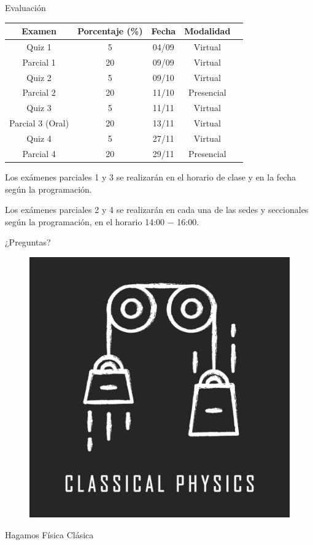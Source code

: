 \begin{frame}{Evaluación}
\begin{table}[]
    \centering
    \begin{tabular}{|c|c|c|c|c|}
    \hline
     \textbf{Examen} &  \textbf{Porcentaje (\%)}  &  \textbf{Fecha}& \textbf{Modalidad}\\\hline
     Quiz 1 & 5  &  04/09& Virtual\\\hline
     Parcial 1 & 20  &  09/09& Virtual\\\hline
     Quiz 2 & 5  & 09/10& Virtual \\\hline
     Parcial 2 & 20  & 11/10& Presencial\\\hline
     Quiz 3 & 5  & 11/11& Virtual\\\hline
     Parcial 3 (Oral) & 20 & 13/11& Virtual\\\hline
     Quiz 4 & 5  & 27/11& Virtual\\\hline
     Parcial 4 & 20  & 29/11& Presencial\\\hline
\end{tabular}
\end{table}

Los exámenes parciales 1 y 3 se realizarán en el horario de clase y en la fecha según la programación.

Los exámenes parciales 2 y 4 se realizarán en cada una de las sedes y seccionales según la programación, en el horario 14:00 $-$ 16:00.

\end{frame}

\begin{frame}
    \begin{center}
        \Huge ¿Preguntas?
    \end{center}
\end{frame}

\begin{frame}

    \begin{figure}
        \centering
        \includegraphics[width=0.5\linewidth]{figures/clasical-physics.jpg}
    \end{figure}
    
\begin{center}
    \LARGE Hagamos Física Clásica
\end{center}
    
\end{frame}

